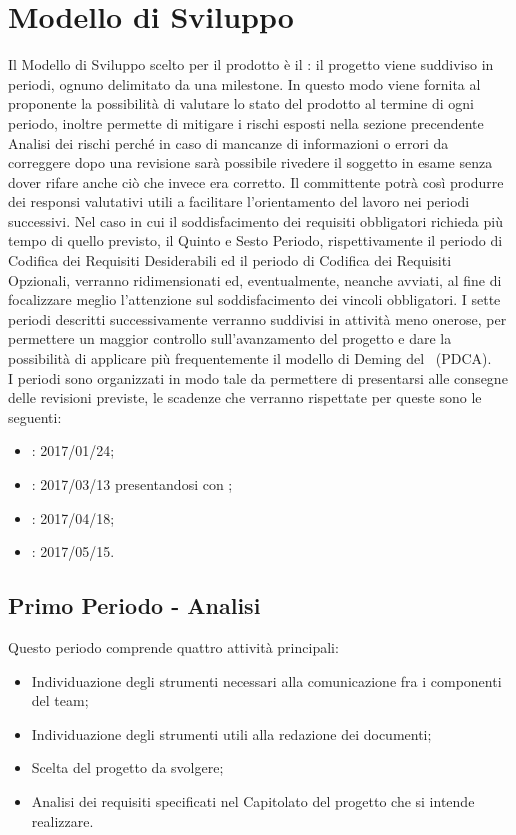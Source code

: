 \documentclass[../PianoDiProgetto_v3.0.0.tex]{subfiles}
\begin{document}
\section{Modello di Sviluppo}
Il Modello di Sviluppo scelto per il prodotto è il : il progetto viene suddiviso in periodi, ognuno delimitato da una milestone. In questo modo viene fornita al proponente la possibilità di valutare lo stato del prodotto al termine di ogni periodo, inoltre permette di mitigare i rischi esposti nella sezione precendente Analisi dei rischi perché in caso di mancanze di informazioni o errori da correggere dopo una revisione sarà possibile rivedere il soggetto in esame senza dover rifare anche ciò che invece era corretto. Il committente potrà così produrre dei responsi valutativi utili a facilitare l'orientamento del lavoro nei periodi successivi. Nel caso in cui il soddisfacimento dei requisiti obbligatori richieda più tempo di quello previsto, il Quinto e Sesto Periodo, rispettivamente il periodo di Codifica dei Requisiti Desiderabili ed il periodo di Codifica dei Requisiti Opzionali, verranno ridimensionati ed, eventualmente, neanche avviati, al fine di focalizzare meglio l'attenzione sul soddisfacimento dei vincoli obbligatori. I sette periodi descritti successivamente verranno suddivisi in attività meno onerose, per permettere un maggior controllo sull’avanzamento del progetto e dare la possibilità di applicare più frequentemente il modello di Deming del \ (PDCA).\\
I periodi sono organizzati in modo tale da permettere di presentarsi alle consegne delle revisioni previste, le scadenze che verranno rispettate per queste sono le seguenti:
	\begin{itemize}
		\item \revisionedeirequisiti: 2017/01/24;
		\item \revisionediprogettazione: 2017/03/13 presentandosi con \revisionediprogettazionemax;
		\item \revisionediqualifica: 2017/04/18;
		\item \revisionediaccettazione: 2017/05/15.
	\end{itemize}

	\subsection{Primo Periodo - Analisi}
	Questo periodo comprende quattro attività principali:

	\begin{itemize}
		\item Individuazione degli strumenti necessari alla comunicazione fra i componenti del team;
		\item Individuazione degli strumenti utili alla redazione dei documenti;
		\item Scelta del progetto da svolgere;
		\item Analisi dei requisiti specificati nel Capitolato del progetto che si intende realizzare.
	\end{itemize}
			
\end{document}
